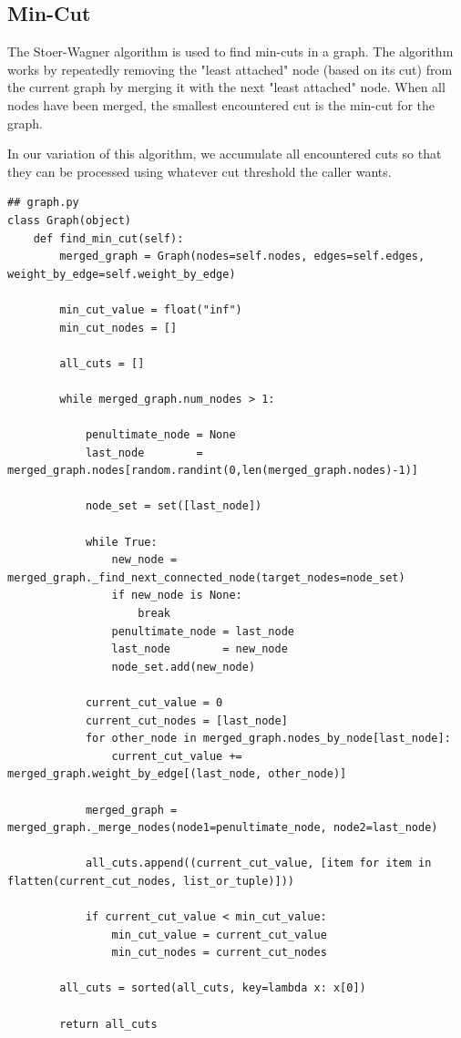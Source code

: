\documentclass{article}
\begin{document}
\subsection{Min-Cut}
\begin{flushleft}

The Stoer-Wagner\cite{stoerwagner} algorithm is used
to find min-cuts in a graph.
The algorithm works by repeatedly removing
the "least attached" node (based on its cut)
from the current graph
by merging it with the next "least attached" node.
When all nodes have been merged,
the smallest encountered cut is the min-cut for the graph.

In our variation of this algorithm,
we accumulate all encountered cuts
so that they can be processed
using whatever cut threshold the caller wants.

\begin{lstlisting}
## graph.py
class Graph(object)
    def find_min_cut(self):
        merged_graph = Graph(nodes=self.nodes, edges=self.edges, weight_by_edge=self.weight_by_edge)

        min_cut_value = float("inf")
        min_cut_nodes = []

        all_cuts = []

        while merged_graph.num_nodes > 1:

            penultimate_node = None
            last_node        = merged_graph.nodes[random.randint(0,len(merged_graph.nodes)-1)]

            node_set = set([last_node])

            while True:
                new_node = merged_graph._find_next_connected_node(target_nodes=node_set)
                if new_node is None:
                    break
                penultimate_node = last_node
                last_node        = new_node
                node_set.add(new_node)

            current_cut_value = 0
            current_cut_nodes = [last_node]
            for other_node in merged_graph.nodes_by_node[last_node]:
                current_cut_value += merged_graph.weight_by_edge[(last_node, other_node)]

            merged_graph = merged_graph._merge_nodes(node1=penultimate_node, node2=last_node)

            all_cuts.append((current_cut_value, [item for item in flatten(current_cut_nodes, list_or_tuple)]))

            if current_cut_value < min_cut_value:
                min_cut_value = current_cut_value
                min_cut_nodes = current_cut_nodes

        all_cuts = sorted(all_cuts, key=lambda x: x[0])

        return all_cuts
\end{lstlisting}

\end{flushleft}
\end{document}
